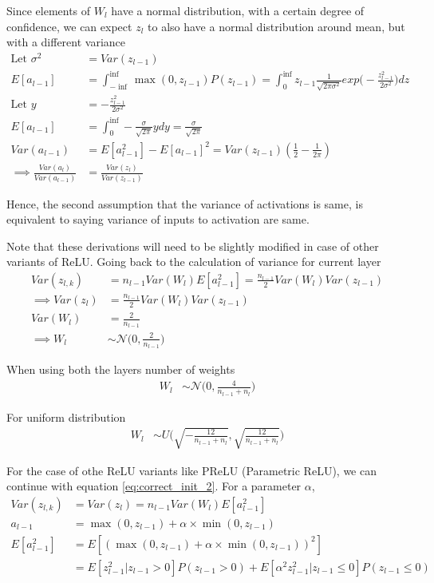 \documentclass[../../deep_learning_notes.tex]{subfiles}
\begin{document}
Since elements of $W_{l}$ have a normal distribution, with a certain degree of confidence, we can expect $z_{l}$ to also have a normal distribution around mean, but with a different variance
\begin{align*}
    \text{Let } \sigma^{2} &= Var(z_{l-1})\\
    E[a_{l-1}] &= \int_{-\inf}^{\inf} \max(0, z_{l-1})P(z_{l-1}) = \int_{0}^{\inf} z_{l-1}\frac{1}{\sqrt{2 \pi \sigma^{2}}} exp \bigg(-\frac{z_{l-1}^{2}}{2 \sigma^{2}}\bigg) dz\\
    \text{Let } y &= -\frac{z_{l-1}^{2}}{2 \sigma^{2}}\\
    E[a_{l-1}] &= \int_{0}^{\inf} -\frac{\sigma}{\sqrt{2\pi}} y dy = \frac{\sigma}{\sqrt{2\pi}}\\
    Var(a_{l-1}) &= E[a_{l-1}^{2}] - E[a_{l-1}]^{2} = Var(z_{l-1})(\frac{1}{2} - \frac{1}{2\pi})\\
    \implies \frac{Var(a_{l})}{Var(a_{l-1})} &= \frac{Var(z_{l})}{Var(z_{l-1})}
\end{align*}

Hence, the second assumption that the variance of activations is same, is equivalent to saying variance of inputs to activation are same.

Note that these derivations will need to be slightly modified in case of other variants of ReLU. Going back to the calculation of variance for current layer
\begin{align*}
    Var(z_{l, k}) &= n_{l-1}Var(W_{l}) E[a_{l-1}^{2}] = \frac{n_{l-1}}{2}Var(W_{l})Var(z_{l-1})\\
    \implies Var(z_{l}) &= \frac{n_{l-1}}{2}Var(W_{l})Var(z_{l-1})\\
    Var(W_{l}) &= \frac{2}{n_{l-1}}\\
    \implies W_{l} &\sim \mathcal{N}\bigg(0, \frac{2}{n_{l-1}}\bigg)
\end{align*}

When using both the layers number of weights
\begin{align*}
    W_{l} &\sim \mathcal{N}\bigg(0, \frac{4}{n_{l-1} + n_{l}}\bigg)
\end{align*}

For uniform distribution
\begin{align*}
    W_{l} &\sim U\bigg(\sqrt{-\frac{12}{n_{l-1} + n_{l}}}, \sqrt{\frac{12}{n_{l-1} + n_{l}}} \bigg)
\end{align*}

For the case of othe ReLU variants like PReLU (Parametric ReLU), we can continue with equation \eqref{eq:correct_init_2}. For a parameter $\alpha$,
\begin{align*}
    Var(z_{l, k}) &= Var(z_{l}) = n_{l-1}Var(W_{l}) E[a_{l-1}^{2}]\\
    a_{l-1} &= \max(0, z_{l-1}) + \alpha \times \min(0, z_{l-1})\\
    E[a_{l-1}^{2}] &= E[(\max(0, z_{l-1}) + \alpha \times \min(0, z_{l-1}))^{2}]\\
    &= E[z_{l-1}^{2}|z_{l-1} > 0]P(z_{l-1} > 0) + E[\alpha^{2} z_{l-1}^{2}|z_{l-1} \leq 0]P(z_{l-1} \leq 0)
\end{align*}
\end{document}

